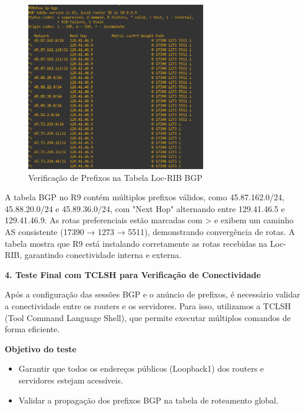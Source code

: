 \documentclass[11pt,english, openright, oneside]{book}
\begin{document}
\begin{figure}[H]
  \centering
  \includegraphics[width=0.70\textwidth]{imagens/Tarefa2/6.bgp_R9.png}
  \caption{Verificação de Prefixos na Tabela Loc-RIB BGP}
  \label{fig:tarefa2_teste3}
\end{figure}

A tabela BGP no R9 contém múltiplos prefixos válidos, como 45.87.162.0/24, 45.88.20.0/24 e 45.89.36.0/24, com "Next Hop" alternando entre 129.41.46.5 e 129.41.46.9. As rotas preferenciais estão marcadas com > e exibem um caminho AS consistente (17390 → 1273 → 5511), demonstrando convergência de rotas. A tabela mostra que R9 está instalando corretamente as rotas recebidas na Loc-RIB, garantindo conectividade interna e externa.


\pagebreak
\textbf{4. Teste Final com TCLSH para Verificação de Conectividade} \par 
\vspace{0.2cm}

Após a configuração das sessões BGP e o anúncio de prefixos, é necessário validar a conectividade entre os routers e os servidores. Para isso, utilizamos a TCLSH (Tool Command Language Shell), que permite executar múltiplos comandos de forma eficiente. \par \vspace{0.8cm}

\textbf{Objetivo do teste}
\begin{itemize}
  \item Garantir que todos os endereços públicos (Loopback1) dos routers e servidores estejam acessíveis.
  \item Validar a propagação dos prefixos BGP na tabela de roteamento global.
\end{itemize}
\end{document}
